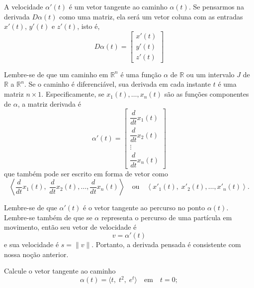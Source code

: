 A velocidade \(\alpha'(t)\) é um vetor tangente ao caminho \(\alpha(t)\). Se pensarmos na derivada \(D\alpha(t)\) como uma matriz, ela será um vetor coluna com as entradas \(x'(t)\), \(y'(t)\) e \(z'(t)\), isto é,
\begin{equation*}
  D\alpha(t)=\left[
  \begin{array}{c}
  x'(t)\\
  y'(t)\\
  z'(t)
  \end{array}
  \right]
\end{equation*}

Lembre-se de que um caminho em $\mathbb{R}^{n}$ é uma função $\alpha$ de $\mathbb{R}$ ou um intervalo $J$ de $\mathbb{R}$ a $\mathbb{R}^{n}$. Se o
caminho é diferenciável, sua derivada em cada instante $t$ é uma matriz $n\times 1$. Especificamente, se $x_{1}(t),\ldots,x_{n}(t)$ são as funções componentes de $\alpha$, a matriz derivada é
\begin{equation*}
\alpha'(t)=\begin{bmatrix}
               \dfrac{d}{dt}x_{1}(t) \\[2ex]
               \dfrac{d}{dt}x_{2}(t)\\[2ex]
               \vdots \\[2ex]
               \dfrac{d}{dt}x_{n}(t)
             \end{bmatrix}
\end{equation*}
que também pode ser escrito em forma de vetor como
\begin{equation*}
\left\langle \frac{d}{dt}x_{1}(t),\; \frac{d}{dt}x_{2}(t), \ldots, \frac{d}{dt}x_{n}(t)\right\rangle \quad \text{ou}\quad \left\langle x'_{1}(t), \; x'_{2}(t), \ldots, x'_{n}(t)\right\rangle.
\end{equation*}

Lembre-se de que $\alpha'(t)$ é o vetor tangente ao percurso no ponto $\alpha(t)$. Lembre-se também de que se $\alpha$ representa o percurso de uma
partícula em movimento, então seu vetor de velocidade é
\begin{equation*}
  v=\alpha'(t)
\end{equation*}
e sua velocidade é $s =\|v\|$. Portanto, a derivada pensada é consistente com nossa noção anterior.

\bigskip
\begin{exc}\label{exer:1-05}
Calcule o vetor tangente ao caminho
\begin{equation*}
\alpha(t) =\langle t,\; t^{2},\; e^{t}\rangle \quad \text{em}  \quad t = 0;
\end{equation*}
\end{exc}

